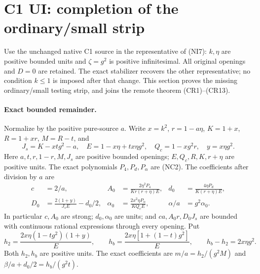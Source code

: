 \section{C1 UI: completion of the ordinary/small strip}
\label{sec:r6-c1-ui}
Use the unchanged native C1 source in the representative of (NI7):
$k,\eta$ are positive bounded units and $\zeta=g^2$ is positive
infinitesimal. All original openings and $D=0$ are retained.
The exact stabilizer recovers the other representative; no condition
$k\le1$ is imposed after that change. This section proves the missing
ordinary/small testing strip, and joins the remote theorem (CR1)--(CR13).

\paragraph{Exact bounded remainder.}
Normalize by the positive pure-source $a$. Write $x=k^2$,
$r=1-a\eta$, $K=1+x$, $R=1+xr$, $M=R-t$, and
\[
 J_s=K-xtg^2-a,\quad E=1-x\eta+tx\eta g^2,\quad
 Q_c=1-xg^2r,\quad y=x\eta g^2.
\]
Here $a,t,r,1-r,M,J_s$ are positive bounded openings; $E,Q_c,R,K,r+\eta$
are positive units. The exact polynomials $P_4,P_d,P_\alpha$ are (NC2).
The coefficients after division by $a$ are
\[
\begin{aligned}
 c&=2/a,& A_0&=\frac{2\eta^2P_4}{Kr(r+\eta)E},&
 d_0&=\frac{4\eta P_d}{K(r+\eta)E},\\
 D_0&=\frac{2(1+y)}{J_sE}-d_0/2,&
 \alpha_0&=\frac{2x^2\eta P_\alpha}{KQ_cE},&
 \alpha/a&=g^2\alpha_0.
\end{aligned}                                                     \tag{CU1}
\]
In particular $c,A_0$ are strong; $d_0,\alpha_0$ are units; and
$ca,A_0r,D_0J_s$ are bounded with continuous rational expressions
through every opening. Put
\[
 h_2=\frac{2x\eta(1-tg^2)(1+y)}E,\qquad
 h_b=\frac{2x\eta[1+(1-t)g^2]}E,
 \qquad h_b-h_2=2x\eta g^2.
\]
Both $h_2,h_b$ are positive units. The exact coefficients are
$m/a=h_2/(g^2M)$ and $\beta/a+d_0/2=h_b/(g^2t)$.

